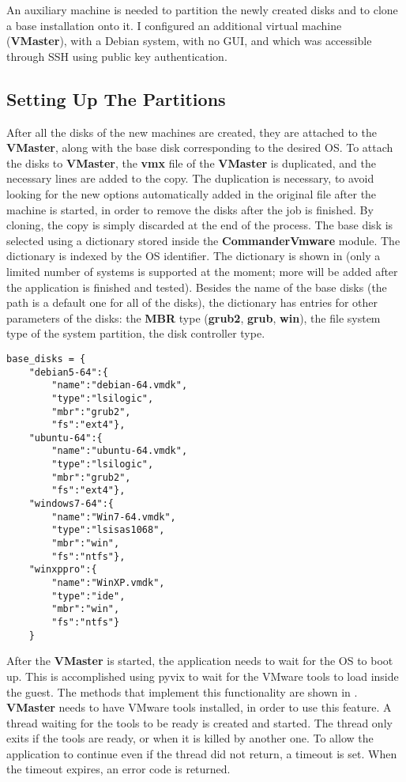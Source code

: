 An auxiliary machine is needed to partition the newly created disks and to
clone a base installation onto it. I configured an additional virtual machine
(\textbf{VMaster}), with a Debian system, with no GUI, and which was accessible
through SSH using public key authentication.

\subsection{Setting Up The Partitions}
\label{sub-sec:vmware-partitions-setup}
After all the disks of the new machines are created, they are attached to the
\textbf{VMaster}, along with the base disk corresponding to the desired OS. To
attach the disks to \textbf{VMaster}, the \textbf{vmx} file of the
\textbf{VMaster} is duplicated, and the necessary lines are added to the copy.
The duplication is necessary, to avoid looking for the new options
automatically added in the original file after the machine is started, in order
to remove the disks after the job is finished. By cloning, the copy is simply
discarded at the end of the process. The base disk is selected using a
dictionary stored inside the \textbf{CommanderVmware} module. The dictionary is
indexed by the OS identifier. The dictionary is shown in
 (only a limited number of systems is
supported at the moment; more will be added after the application is finished
and tested). Besides the name of the base disks (the path is a default one for
all of the disks), the dictionary has entries for other parameters of the
disks: the \textbf{MBR} type (\textbf{grub2}, \textbf{grub}, \textbf{win}), the
file system type of the system partition, the disk controller type.

\lstset{caption=sample OS based dictionary,label=lst:basedisk-dict}
\begin{lstlisting}
base_disks = {
	"debian5-64":{ 
		"name":"debian-64.vmdk",
		"type":"lsilogic",
		"mbr":"grub2",
		"fs":"ext4"},
	"ubuntu-64":{
		"name":"ubuntu-64.vmdk",
		"type":"lsilogic",
		"mbr":"grub2",
		"fs":"ext4"},
	"windows7-64":{
		"name":"Win7-64.vmdk",
		"type":"lsisas1068",
		"mbr":"win",
		"fs":"ntfs"},
	"winxppro":{
		"name":"WinXP.vmdk",
		"type":"ide",
		"mbr":"win",
		"fs":"ntfs"}
	}
\end{lstlisting}

After the \textbf{VMaster} is started, the application needs to wait for the OS
to boot up. This is accomplished using pyvix to wait for the VMware tools to
load inside the guest. The methods that implement this functionality are shown
in . \textbf{VMaster} needs to
have VMware tools installed, in order to use this feature. A thread waiting for
the tools to be ready is created and started. The thread only exits if the
tools are ready, or when it is killed by another one. To allow the application
to continue even if the thread did not return, a timeout is set. When the
timeout expires, an error code is returned.

